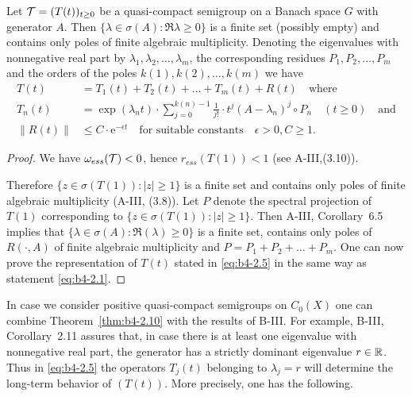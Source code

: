 \begin{theorem}\label{thm:b4-2.10}
%
	Let $\mathcal{T} = (T(t))_{t \geq 0}$ be a quasi-compact semigroup on a Banach space $G$ with generator $A$. 
    Then $\{\lambda \in \sigma(A) \colon \Re \lambda \geq 0\}$ is a finite set (possibly empty) and contains only poles of finite algebraic multiplicity. 
    Denoting the eigenvalues with nonnegative real part by $\lambda_1,\lambda_2, \ldots ,\lambda_m$, the corresponding residues $P_1,P_2, \ldots ,P_m$ and the orders of the poles $k(1),k(2), \ldots, k(m)$ we have
	\begin{equation}\label{eq:b4-2.5}
		\begin{aligned}
		T(t) &= T_1(t) + T_2(t) + \ldots + T_m(t) + R(t) \quad \text{where}\\
		T_n(t) &= \exp(\lambda_nt) \cdot \sum_{j=0}^{k(n)-1} \frac{1}{j!} \cdot t^j (A - \lambda_n)^j \circ P_n \quad (t \geq 0) \quad \text{and}\\
		\|R(t)\| &\leq C \cdot \mathrm{e}^{-\epsilon t} \quad \text{for suitable constants} \quad \epsilon > 0, C \geq 1 .		
		\end{aligned}
	\end{equation}
\end{theorem}
\begin{proof} We have $\omega_{ess}(\mathcal{T}) < 0$, hence $r_{ess}(T(1)) < 1$ (see A-III,\;(3.10)).

Therefore $\{z \in \sigma(T(1)) \colon |z| \geq 1\}$ is a finite set and contains only poles of finite algebraic multiplicity (\cf A-III, (3.8)). 
Let $P$ denote the spectral projection of $T(1)$ corresponding to $\{z \in \sigma(T(1))\colon |z| \geq 1\}$. 
Then A-III, Corollary~6.5 implies that $\{\lambda \in \sigma(A) \colon \Re(\lambda) \geq 0\}$ is a finite set, contains only poles of $R(\cdot,A)$ of finite algebraic multiplicity and $P = P_1+P_2+ \ldots +P_m$. 
One can now prove the representation of $T(t)$ stated in \eqref{eq:b4-2.5} in the same way as statement \eqref{eq:b4-2.1}.
\end{proof}
In case we consider positive quasi-compact semigroups on $C_{0}(X)$ one can combine Theorem~\ref{thm:b4-2.10} with the results of B-III. 
For example, B-III, Corollary~2.11 assures that, in case there is at least one eigenvalue with nonnegative real part, the generator has a strictly dominant eigenvalue $r \in \mathbb{R}$. 
Thus in \eqref{eq:b4-2.5} the operators $T_j(t)$ belonging to $\lambda_j = r$ will determine the long-term behavior of $(T(t))$. More precisely, one has the following.
